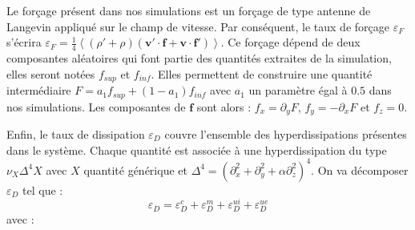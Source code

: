   Le forçage présent dans nos simulations est un forçage de type antenne de Langevin appliqué sur le champ de vitesse. Par conséquent, le taux de forçage $\varepsilon_{F}$ s'écrira $\varepsilon_{F} = \frac{1}{4} \left< (\rho'+\rho) (\boldsymbol{v'} \cdot  \boldsymbol{f} + \boldsymbol{v} \cdot  \boldsymbol{f'} ) \right>$. Ce forçage dépend de deux composantes aléatoires qui font partie des quantités extraites de la simulation, elles seront notées $f_{sup}$ et $f_{inf}$. Elles permettent de construire une quantité intermédiaire $F = a_1 f_{sup} + (1-a_1) f_{inf}$ avec $a_1$ un paramètre égal à $0.5$ dans nos simulations. Les composantes de $\boldsymbol{f}$ sont alors : $f_x = \partial_y F$, $f_y = - \partial_x F$ et $f_z = 0$. 
  
  Enfin, le taux de dissipation $\varepsilon_{D}$ couvre l'ensemble des hyperdissipations présentes dans le système. Chaque quantité est associée à une hyperdissipation du type $ \nu_X \Delta^4 X$ avec $X$ quantité générique et $\Delta^4 = (\partial^2_x + \partial^2_y + \alpha \partial^2_z)^4$. On va décomposer $\varepsilon_{D}$ tel que : 
  \begin{equation}
      \varepsilon_{D} = \varepsilon^{c}_{D} + \varepsilon^{m}_{D} + \varepsilon^{ui}_{D} + \varepsilon^{ue}_{D}
  \end{equation}
  avec : 
